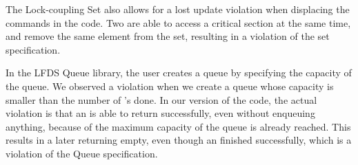 The Lock-coupling Set also allows for a lost update violation when displacing
the \unlock{} commands in the code. Two \Removem{} are able to access a 
critical section at the same time, and remove the same element from the set,
resulting in a violation of the set specification.
 
In the LFDS Queue library, the user creates a queue by specifying the capacity
of the queue. We observed a violation when we create a queue whose capacity
is smaller than the number of \Enqueuem{}'s done. In our version of the code, 
the actual violation is that an \Enqueuem{} is able to return successfully, 
even without enqueuing anything, because of the maximum capacity of the queue
is already reached. This results in a later \Dequeuem{} returning empty, 
even though an \Enqueuem{} finished successfully, which is a violation of the 
Queue specification.

